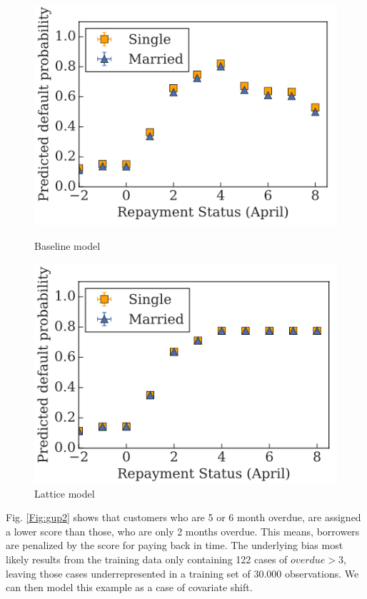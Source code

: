 \begin{figure}[htb!]
	\centering
	\begin{minipage}{0.45\textwidth}
		\centering
		\includegraphics[width=1\textwidth]{img/gup2} %
		\caption{Baseline model}
		\label{Fig:gup2}
	\end{minipage}\hfill
	\begin{minipage}{0.45\textwidth}
		\centering
		\includegraphics[width=1\textwidth]{img/gup1} %
		\caption{Lattice model}
		\label{Fig:gup1}
	\end{minipage}
\end{figure}

Fig. \ref{Fig:gup2} shows that customers who are 5 or 6 month overdue, are assigned a lower score than those, who are only 2 months overdue. This means, borrowers are penalized by the score for paying back in time. The underlying bias most likely results from the training data only containing 122 cases of $overdue > 3$, leaving those cases underrepresented in a training set of 30.000 observations. We can then model this example as a case of covariate shift.  

